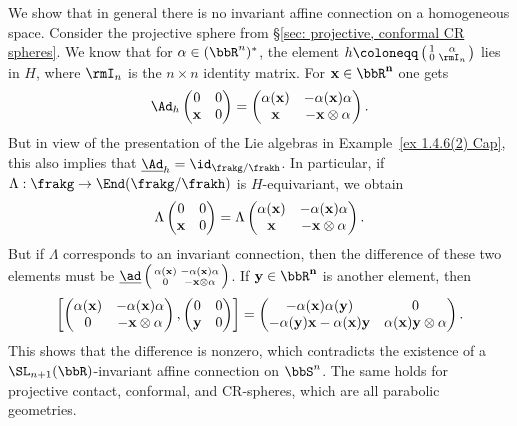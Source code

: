 \begin{example}
    We show that in general there is no invariant affine connection on a homogeneous space. Consider the projective sphere from \S\ref{sec: projective, conformal CR spheres}. We know that for $\alpha\in (\bbR^n)^\ast$, the element $h\coloneqq \left(\begin{smallmatrix}
        1&\alpha \\ 0& \rmI_n
    \end{smallmatrix}\right)$
    lies in $H$, where $\rmI_n$ is the $n\times n$ identity matrix. For $\bf{x}\in\bbR^n$ one gets 
    \[\Ad_h \begin{pmatrix}
        0&0\\ \bf{x}&0
    \end{pmatrix}=
    \begin{pmatrix}
        \alpha(\bf{x})&-\alpha(\bf{x})\alpha\\
        \bf{x}&-\bf{x}\otimes\alpha 
    \end{pmatrix}.
    \]
    But in view of the presentation of the Lie algebras in Example~\ref{ex 1.4.6(2) Cap}, this also implies that $\underline{\Ad}_h=\id_{\frakg\slash\frakh}$. In particular, if $\Lambda:\frakg\to \End(\frakg\slash\frakh)$ is $H$-equivariant, we obtain 
    \[\Lambda \begin{pmatrix}
        0&0\\\bf{x}&0
    \end{pmatrix}=
    \Lambda \begin{pmatrix}
        \alpha(\bf{x})&-\alpha(\bf{x})\alpha\\
        \bf{x}&-\bf{x}\otimes\alpha 
    \end{pmatrix}.\]
    But if $\Lambda$ corresponds to an invariant connection, then the difference of these two elements must be $\underline{\ad}\left(\begin{smallmatrix}
        \alpha(\bf{x})&-\alpha(\bf{x})\alpha\\
        0& -\bf{x}\otimes\alpha
    \end{smallmatrix}\right)$. If $\bf{y}\in\bbR^n$ is another element, then 
    \[\left[
    \begin{pmatrix}
        \alpha(\bf{x})&-\alpha(\bf{x})\alpha\\
        0& -\bf{x}\otimes\alpha
    \end{pmatrix},
    \begin{pmatrix}
        0&0\\\bf{y}&0
    \end{pmatrix}
    \right]=
    \begin{pmatrix}
        -\alpha(\bf{x})\alpha(\bf{y})&0\\
        -\alpha(\bf{y})\bf{x}-\alpha(\bf{x})\bf{y}&\alpha(\bf{x})\bf{y}\otimes\alpha
    \end{pmatrix}.
    \]
    This shows that the difference is nonzero, which contradicts the existence of a $\SL_{n+1}(\bbR)$-invariant affine connection on $\bbS^n$. The same holds for projective contact, conformal, and CR-spheres, which are all parabolic geometries.
\end{example}


